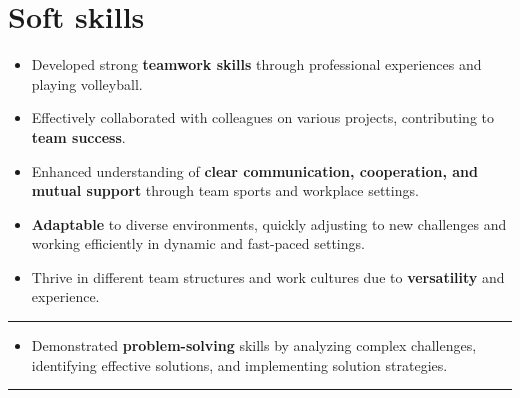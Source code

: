 \documentclass[a4paper,10pt]{article}
\begin{document}
\begin{minipage}[t]{0.25\textwidth}
    \section*{Soft skills}

\end{minipage}
\hfill
\begin{minipage}[t]{0.75\textwidth}
        \begin{itemize}[leftmargin=1cm]
        \item Developed strong \textbf{teamwork skills} through professional experiences and playing volleyball.
        \item Effectively collaborated with colleagues on various projects, contributing to \textbf{team success}.
        \item Enhanced understanding of \textbf{clear communication, cooperation, and mutual support} through team sports and workplace settings.
        \item \textbf{Adaptable} to diverse environments, quickly adjusting to new challenges and working efficiently in dynamic and fast-paced settings.
        \item Thrive in different team structures and work cultures due to \textbf{versatility} and experience.
    \end{itemize}
\end{minipage}

\begin{minipage}[t]{0.25\textwidth}
    \vspace{0.9cm} %
    \rule{0.6cm}{0.3mm}
\end{minipage}
\hfill
\begin{minipage}[t]{0.75\textwidth}
        \begin{itemize}[leftmargin=1cm]
         \item Demonstrated \textbf{problem-solving} skills by analyzing complex challenges, identifying effective solutions, and implementing solution strategies.
    \end{itemize}
    


    \rule{\linewidth}{0.5mm}
\end{minipage}
\end{document}
